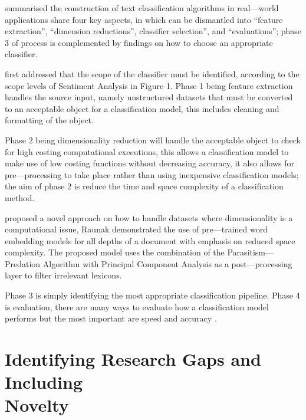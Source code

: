 \textcite{kowsari2019text} summarised the construction of text classification algorithms in real---world applications share four key aspects, in which can be dismantled into “feature extraction”, “dimension reductions”, classifier selection”, and “evaluations”; phase 3 of \textcite{kowsari2019text} process is complemented by \textcite{enriquez2013comparative} findings on how to choose an appropriate classifier.

\textcite{kowsari2019text} first addressed that the scope of the classifier must be identified, according to the scope levels of Sentiment Analysis in Figure 1. Phase 1 being feature extraction handles the source input, namely unstructured datasets that must be converted to an acceptable object for a classification model, this includes cleaning and formatting of the object.

Phase 2 being dimensionality reduction will handle the acceptable object to check for high costing computational executions, this allows a classification model to make use of low costing functions without decreasing accuracy, it also allows for pre---processing to take place rather than using inexpensive classification models; the aim of phase 2 is reduce the time and space complexity of a classification method.

\textcite{raunak2019effective} proposed a novel approach on how to handle datasets where dimensionality is a computational issue, Raunak demonstrated the use of pre---trained word embedding models for all depths of a document with emphasis on reduced space complexity. The proposed model uses the combination of the Parasitism---Predation Algorithm with Principal Component Analysis as a post---processing layer to filter irrelevant lexicons.

Phase 3 is simply identifying the most appropriate classification pipeline. Phase 4 is evaluation, there are many ways to evaluate how a classification model performs but the most important are speed and accuracy \textcite{kowsari2019text}.

\section[Identifying Research Gaps and Including Novelty]{\texorpdfstring{Identifying Research Gaps and Including \\ Novelty}{Identifying Research Gaps and Including Novelty}} \label{section:IdentifyingResearchGapsandIncludingNovelty}

